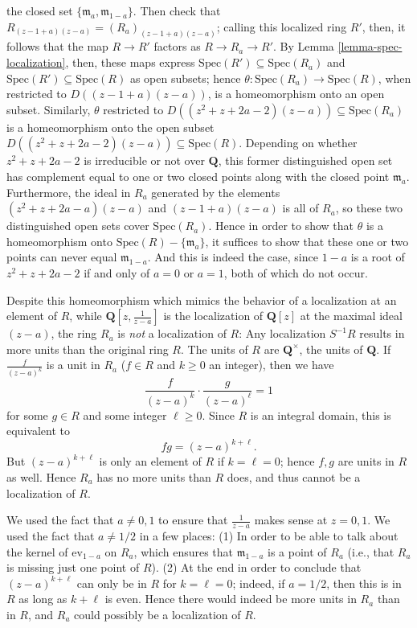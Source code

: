 \begin{example}
the closed set $\lbrace\mathfrak{m}_a,\mathfrak{m}_{1-a}\rbrace$.
Then check that $R_{(z-1+a)(z-a)}=(R_a)_{(z-1+a)(z-a)}$; calling
this localized ring $R'$, then, it follows that the map $R\to R'$
factors as $R\to R_a\to R'$.  By Lemma
\ref{lemma-spec-localization}, then, these maps express
$\text{Spec}(R')\subseteq\text{Spec}(R_a)$ and
$\text{Spec}(R')\subseteq\text{Spec}(R)$ as open subsets; hence
$\theta:\text{Spec}(R_a)\to\text{Spec}(R)$, when restricted to
$D((z-1+a)(z-a))$, is a homeomorphism onto an open subset.
Similarly, $\theta$ restricted to
$D((z^2+z+2a-2)(z-a))\subseteq\text{Spec}(R_a)$ is a homeomorphism
onto the open subset $D((z^2+z+2a-2)(z-a))\subseteq\text{Spec}(R)$.
Depending on whether $z^2+z+2a-2$ is irreducible or not over
$\mathbf{Q}$, this former distinguished open set has complement
equal to one or two closed points along with the closed point
$\mathfrak{m}_a$. Furthermore, the ideal in $R_a$ generated by the
elements $(z^2+z+2a-a)(z-a)$ and $(z-1+a)(z-a)$ is all of $R_a$, so
these two distinguished open sets cover $\text{Spec}(R_a)$. Hence in
order to show that $\theta$ is a homeomorphism onto
$\text{Spec}(R)-\lbrace\mathfrak{m}_a\rbrace$, it suffices to show
that these one or two points can never equal $\mathfrak{m}_{1-a}$.
And this is indeed the case, since $1-a$ is a root of $z^2+z+2a-2$
if and only of $a=0$ or $a=1$, both of which do not occur.

\medskip\noindent
Despite this homeomorphism which mimics the behavior of a
localization at an element of $R$, while
$\mathbf{Q}[z,\frac{1}{z-a}]$ is the localization of $\mathbf{Q}[z]$
at the maximal ideal $(z-a)$, the ring $R_a$ is \textit{not} a
localization of $R$: Any localization $S^{-1}R$ results in more
units than the original ring $R$.  The units of $R$ are
$\mathbf{Q}^\times$, the units of $\mathbf{Q}$.  If
$\frac{f}{(z-a)^k}$ is a unit in $R_a$ ($f\in R$ and $k\geq0$ an
integer), then we have
$$
\frac{f}{(z-a)^k}\cdot\frac{g}{(z-a)^\ell}=1
$$
for some $g\in R$ and some integer $\ell\geq0$.  Since $R$ is an
integral domain, this is equivalent to
$$
fg=(z-a)^{k+\ell}.
$$
But $(z-a)^{k+\ell}$ is only an element of $R$ if $k=\ell=0$; hence
$f,g$ are units in $R$ as well.  Hence $R_a$ has no more units than
$R$ does, and thus cannot be a localization of $R$.

\medskip\noindent
We used the fact that $a\neq0,1$ to ensure that
$\frac{1}{z-a}$ makes sense at $z=0,1$.  We used the fact that
$a\neq1/2$ in a few places: (1) In order to be able to talk about
the kernel of $\text{ev}_{1-a}$ on $R_a$, which ensures that
$\mathfrak{m}_{1-a}$ is a point of $R_a$ (i.e., that $R_a$ is
missing just one point of $R$). (2) At the end in order to conclude
that $(z-a)^{k+\ell}$ can only be in $R$ for $k=\ell=0$; indeed, if
$a=1/2$, then this is in $R$ as long as $k+\ell$ is even. Hence
there would indeed be more units in $R_a$ than in $R$, and $R_a$
could possibly be a localization of $R$.
\end{example}









